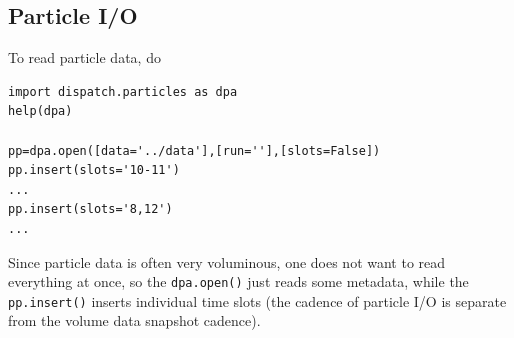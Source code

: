 \documentclass[paper=a4,fontsize=11pt]{scrartcl}
\numberwithin{equation}{section}		%
\numberwithin{figure}{section}			%
\numberwithin{table}{section}				%
\newcommand{\codecolor}{\color{Blue}}
\newcommand{\Code}[1]{{\codecolor\texttt{#1}}}
\begin{document}
\subsection{Particle I/O}
To read particle data, do

{\codecolor \begin{verbatim}
import dispatch.particles as dpa
help(dpa)

pp=dpa.open([data='../data'],[run=''],[slots=False])
pp.insert(slots='10-11')
...
pp.insert(slots='8,12')
...
\end{verbatim}}
Since particle data is often very voluminous, one does not want to read everything at once, so the \Code{dpa.open()} just reads some metadata, while the \Code{pp.insert()} inserts individual time slots (the cadence of particle I/O is separate from the volume data snapshot cadence).

\end{document}
